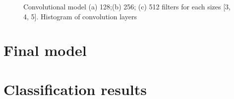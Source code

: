 \begin{figure}[ht]
	\begin{minipage}[ht]{1\linewidth}
	\end{minipage}
	\hfill
	\begin{minipage}[ht]{1\linewidth}
	\end{minipage}
	\caption{Convolutional model (a) 128;(b) 256; (c) 512 filters for each sizes [3, 4, 5]. Histogram of convolution layers}
	\label{img:category_crossentropy}  
\end{figure}

\clearpage
\section{Final model} \label{sect4_5}

\clearpage
\section{Classification results} \label{sect4_6}



